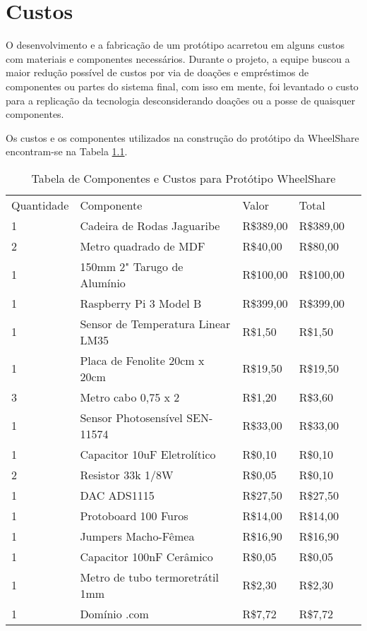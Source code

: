 \chapter[Custos]{Custos}

O desenvolvimento e a fabricação de um protótipo acarretou em alguns custos 
com materiais e componentes necessários. Durante o projeto, a equipe buscou a 
maior redução possível de custos por via de doações e empréstimos de 
componentes ou partes do sistema final, com isso em mente, foi levantado o 
custo para a replicação da tecnologia desconsiderando doações ou a posse de 
quaisquer componentes. 

Os custos e os componentes utilizados na construção do protótipo da WheelShare 
encontram-se na Tabela \ref{tab:custos}.

\begin{table}[]
\centering
\caption{Tabela de Componentes e Custos para Protótipo WheelShare}
\label{tab:custos}
\begin{tabular}{lllll}
Quantidade & Componente & Valor & Total &  \\
1 & Cadeira de Rodas Jaguaribe & R\$389,00 & R\$389,00 &  \\
2 & Metro quadrado de MDF & R\$40,00 & R\$80,00 &  \\
1 & 150mm 2" Tarugo de Alumínio & R\$100,00 & R\$100,00 &  \\
1 & Raspberry Pi 3 Model B & R\$399,00 & R\$399,00 &  \\
1 & Sensor de Temperatura Linear LM35 & R\$1,50 & R\$1,50 &  \\
1 & Placa de Fenolite 20cm x 20cm & R\$19,50 & R\$19,50 &  \\
3 & Metro cabo 0,75 x 2 & R\$1,20 & R\$3,60 &  \\
1 & Sensor Photosensível SEN-11574 & R\$33,00 & R\$33,00 &  \\
1 & Capacitor 10uF Eletrolítico & R\$0,10 & R\$0,10 &  \\
2 & Resistor 33k 1/8W & R\$0,05 & R\$0,10 &  \\
1 & DAC ADS1115 & R\$27,50 & R\$27,50 &  \\
1 & Protoboard 100 Furos & R\$14,00 & R\$14,00 &  \\
1 & Jumpers Macho-Fêmea & R\$16,90 & R\$16,90 &  \\
1 & Capacitor 100nF Cerâmico & R\$0,05 & R\$0,05 &  \\
1 & Metro de tubo termoretrátil 1mm & R\$2,30 & R\$2,30 &  \\
1 & Domínio .com & R\$7,72 & R\$7,72 & \\

\end{tabular}
\end{table}
